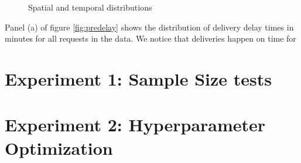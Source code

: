 \begin{figure}[h]
	\centering
	\caption{Spatial and temporal distributions}
	\label{fig:prepdelay}
\end{figure}

Panel (a) of figure \ref{fig:predelay} shows the distribution of delivery delay times in minutes for all requests in the data. We notice that deliveries happen on time for 


 
\section{Experiment 1: Sample Size tests}


\section{Experiment 2: Hyperparameter Optimization}

